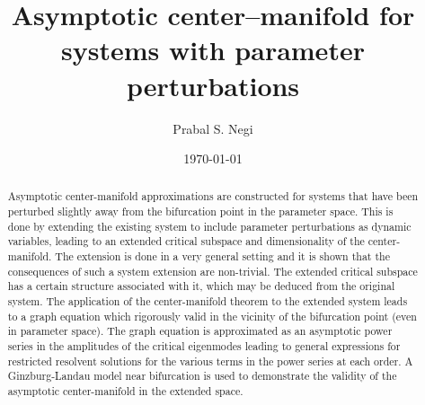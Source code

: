 \documentclass[aps,prr,twocolumn,groupedaddress]{revtex4-2}
\begin{document}
	
\title{Asymptotic center--manifold for systems with parameter perturbations}
\author{Prabal S. Negi}

\date{\today}

\begin{abstract}
Asymptotic center-manifold approximations are constructed for systems that have been perturbed slightly away from the bifurcation point in the parameter space. This is done by extending the existing system to include parameter perturbations as dynamic variables, leading to an extended critical subspace and dimensionality of the center-manifold. 
The extension is done in a very general setting and it is shown that the consequences of such a system extension are non-trivial. The extended critical subspace has a certain structure associated with it, which may be deduced from the original system. The application of the center-manifold theorem to the extended system leads to a graph equation which rigorously valid in the vicinity of the bifurcation point (even in parameter space). The graph equation is approximated as an asymptotic power series in the amplitudes of the critical eigenmodes leading to general expressions for restricted resolvent solutions for the various terms in the power series at each order. A Ginzburg-Landau model near bifurcation is used to demonstrate the validity of the asymptotic center-manifold in the extended space.
\end{abstract}

\maketitle

%


%


\FloatBarrier



\end{document}
